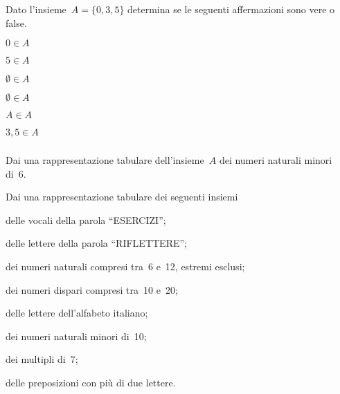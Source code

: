 \begin{esercizio}
\label{ese:5.15}
Dato l'insieme~$A = {\{0, 3, 5\}}$ determina se le seguenti affermazioni sono 
vere o false.
\TabPositions{2.5cm}
\begin{enumeratea}
\item $0\in A$ \tab\boxV\quad\boxF
\item $5\in A$ \tab\boxV\quad\boxF
\item $\emptyset \in A$ \tab\boxV\quad\boxF
\item $\emptyset\in A$ \tab\boxV\quad\boxF
\item $A\in A$ \tab\boxV\quad\boxF
\item $3,5\in A$ \tab\boxV\quad\boxF
\end{enumeratea}
\end{esercizio}


\subsubsection*{}

\begin{esercizio}
\label{ese:6.1}
Dai una rappresentazione tabulare dell'insieme~$A$ dei numeri naturali minori 
di~6.
\end{esercizio}

\begin{esercizio}
\label{ese:6.2}
Dai una rappresentazione tabulare dei seguenti insiemi
\begin{enumeratea}
 \item delle vocali della parola ``ESERCIZI'';
 \item delle lettere della parola ``RIFLETTERE'';
 \item dei numeri naturali compresi tra~6 e~12, estremi esclusi;
 \item dei numeri dispari compresi tra~10 e~20;
 \item delle lettere dell'alfabeto italiano;
 \item dei numeri naturali minori di~10;
 \item dei multipli di~7;
 \item delle preposizioni con più di due lettere.
\end{enumeratea}
\end{esercizio}

